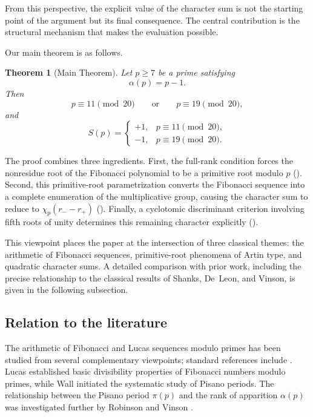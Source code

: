 \documentclass[preprint,12pt]{elsarticle}
\numberwithin{equation}{section}
\theoremstyle{plain}
\newtheorem{theorem}{Theorem}[section]
\theoremstyle{definition}
\begin{document}
From this perspective, the explicit value of the character sum is not
the starting point of the argument but its final consequence. The
central contribution is the structural mechanism that makes the
evaluation possible.
 
Our main theorem is as follows.
 
\begin{theorem}[Main Theorem]\label{thm:main}
Let $p\ge 7$ be a prime satisfying
\[
\alpha(p)=p-1.
\]
Then
\[
p\equiv11\pmod{20}
\qquad\text{or}\qquad
p\equiv19\pmod{20},
\]
and
\[
S(p)=
\begin{cases}
+1,& p\equiv11\pmod{20},\\
-1,& p\equiv19\pmod{20}.
\end{cases}
\]
\end{theorem}
 
The proof combines three ingredients. First, the full-rank condition
forces the nonresidue root of the Fibonacci polynomial to be a
primitive root modulo $p$ ().
Second, this primitive-root parametrization converts the Fibonacci
sequence into a complete enumeration of the multiplicative group,
causing the character sum to reduce to
$\chi_p(r_- - r_+)$ (). Finally, a
cyclotomic discriminant criterion involving fifth roots of unity
determines this remaining character explicitly
().
 
This viewpoint places the paper at the intersection of three
classical themes:
the arithmetic of Fibonacci sequences,
primitive-root phenomena of Artin type,
and quadratic character sums.
A detailed comparison with prior work, including the precise
relationship to the classical results of Shanks, De~Leon, and
Vinson, is given in the following subsection.
 
\subsection{Relation to the literature}
 
The arithmetic of Fibonacci and Lucas sequences modulo primes has
been studied from several complementary viewpoints; standard
references include \cite{Vajda1989,Koshy2001,Lemmermeyer2000,IrelandRosen1990}. Lucas \cite{Lucas1878} established basic
divisibility properties of Fibonacci numbers modulo primes, while
Wall \cite{Wall1960} initiated the systematic study of Pisano
periods. The relationship between the Pisano period $\pi(p)$ and the rank of
apparition $\alpha(p)$ was investigated further by Robinson
\cite{Robinson1963} and Vinson \cite{Vinson1963}.
 
\end{document}
